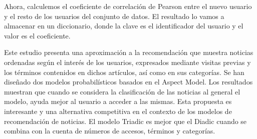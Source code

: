 \documentclass{uimppracticas}
\begin{document}
Ahora, calculemos el coeficiente de correlación de Pearson entre el nuevo usuario y el resto de los usuarios del conjunto de datos. El resultado lo vamos a almacenar en un diccionario, donde la clave es el identificador del usuario y el valor es el coeficiente.


Este estudio presenta una aproximación a la recomendación que muestra
noticias ordenadas según el interés de los usuarios, expresados mediante
visitas previas y los términos contenidos en dichos artículos, así como en sus
categorías.
Se han diseñado dos modelos probabilísticos basados en el Aspect Model.
Los resultados muestran que cuando se considera la clasificación de las
noticias al general el modelo, ayuda mejor al usuario a acceder a las mismas.
Esta propuesta es interesante y una alternativa competitiva en el contexto de
los modelos de recomendación de noticias.
El modelo Triadic es mejor que el Diadic cuando se combina con la cuenta de
números de accesos, términos y categorías.

\renewcommand{\refname}{Bibliografía}


	
\end{document}
